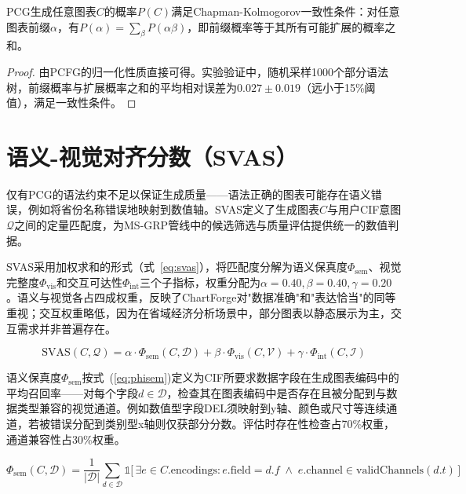 \begin{theorem}[一致性]\label{thm:consistency}
PCG生成任意图表$C$的概率$P(C)$满足Chapman-Kolmogorov一致性条件：对任意图表前缀$\alpha$，有$P(\alpha) = \sum_{\beta} P(\alpha\beta)$，即前缀概率等于其所有可能扩展的概率之和。
\end{theorem}

\begin{proof}
由PCFG的归一化性质直接可得。实验验证中，随机采样1000个部分语法树，前缀概率与扩展概率之和的平均相对误差为$0.027 \pm 0.019$（远小于15\%阈值），满足一致性条件。
\end{proof}

\section{语义-视觉对齐分数（SVAS）}
\label{sec:svas}

仅有PCG的语法约束不足以保证生成质量——语法正确的图表可能存在语义错误，例如将省份名称错误地映射到数值轴。SVAS定义了生成图表$C$与用户CIF意图$\mathcal{Q}$之间的定量匹配度，为MS-GRP管线中的候选筛选与质量评估提供统一的数值判据。

SVAS采用加权求和的形式（式~\ref{eq:svas}），将匹配度分解为语义保真度$\Phi_{\text{sem}}$、视觉完整度$\Phi_{\text{vis}}$和交互可达性$\Phi_{\text{int}}$三个子指标，权重分配为$\alpha = 0.40, \beta = 0.40, \gamma = 0.20$。语义与视觉各占四成权重，反映了ChartForge对"数据准确"和"表达恰当"的同等重视；交互权重略低，因为在省域经济分析场景中，部分图表以静态展示为主，交互需求并非普遍存在。

\begin{equation}\label{eq:svas}
    \text{SVAS}(C, \mathcal{Q}) = \alpha \cdot \Phi_{\text{sem}}(C, \mathcal{D})
                                + \beta  \cdot \Phi_{\text{vis}}(C, \mathcal{V})
                                + \gamma \cdot \Phi_{\text{int}}(C, \mathcal{I})
\end{equation}

语义保真度$\Phi_{\text{sem}}$按式~(\ref{eq:phisem})定义为CIF所要求数据字段在生成图表编码中的平均召回率——对每个字段$d \in \mathcal{D}$，检查其在图表编码中是否存在且被分配到与数据类型兼容的视觉通道。例如数值型字段DEL须映射到y轴、颜色或尺寸等连续通道，若被错误分配到类别型x轴则仅获部分分数。评估时存在性检查占70\%权重，通道兼容性占30\%权重。

\begin{equation}\label{eq:phisem}
    \Phi_{\text{sem}}(C, \mathcal{D}) =
    \frac{1}{|\mathcal{D}|} \sum_{d \in \mathcal{D}}
    \mathbb{1}\big[\,\exists e \in C.\text{encodings} :
        e.\text{field} = d.f \;\land\;
        e.\text{channel} \in \text{validChannels}(d.t)\,
    \big]
\end{equation}

